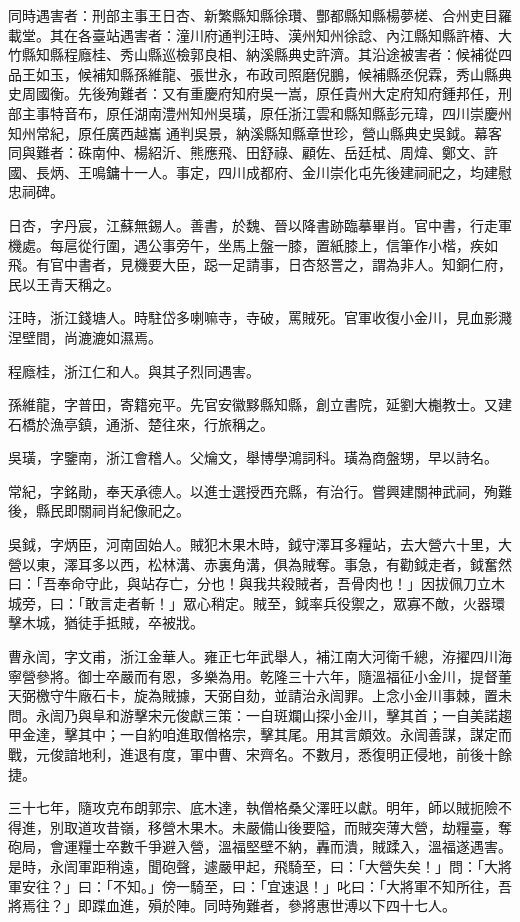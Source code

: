 \begin{pinyinscope}
同時遇害者：刑部主事王日杏、新繁縣知縣徐瓚、酆都縣知縣楊夢槎、合州吏目羅載堂。其在各臺站遇害者：潼川府通判汪時、漢州知州徐諗、內江縣知縣許椿、大竹縣知縣程廕桂、秀山縣巡檢郭良相、納溪縣典史許濟。其沿途被害者：候補從四品王如玉，候補知縣孫維龍、張世永，布政司照磨倪鵬，候補縣丞倪霖，秀山縣典史周國衡。先後殉難者：又有重慶府知府吳一嵩，原任貴州大定府知府鍾邦任，刑部主事特音布，原任湖南澧州知州吳璜，原任浙江雲和縣知縣彭元瑋，四川崇慶州知州常紀，原任廣西越巂通判吳景，納溪縣知縣章世珍，營山縣典史吳鉞。幕客同與難者：硃南仲、楊紹沂、熊應飛、田舒祿、顧佐、岳廷栻、周煒、鄭文、許國、長炳、王鳴鏞十一人。事定，四川成都府、金川崇化屯先後建祠祀之，均建慰忠祠碑。

日杏，字丹宸，江蘇無錫人。善書，於魏、晉以降書跡臨摹畢肖。官中書，行走軍機處。每扈從行圍，遇公事旁午，坐馬上盤一膝，置紙膝上，信筆作小楷，疾如飛。有官中書者，見機要大臣，跽一足請事，日杏怒詈之，謂為非人。知銅仁府，民以王青天稱之。

汪時，浙江錢塘人。時駐岱多喇嘛寺，寺破，罵賊死。官軍收復小金川，見血影濺涅壁間，尚漉漉如濕焉。

程廕桂，浙江仁和人。與其子烈同遇害。

孫維龍，字普田，寄籍宛平。先官安徽黟縣知縣，創立書院，延劉大櫆教士。又建石橋於漁亭鎮，通浙、楚往來，行旅稱之。

吳璜，字鑒南，浙江會稽人。父爚文，舉博學鴻詞科。璜為商盤甥，早以詩名。

常紀，字銘勛，奉天承德人。以進士選授西充縣，有治行。嘗興建關神武祠，殉難後，縣民即關祠肖紀像祀之。

吳鉞，字炳臣，河南固始人。賊犯木果木時，鉞守澤耳多糧站，去大營六十里，大營以東，澤耳多以西，松林溝、赤裏角溝，俱為賊奪。事急，有勸鉞走者，鉞奮然曰：「吾奉命守此，與站存亡，分也！與我共殺賊者，吾骨肉也！」因拔佩刀立木城旁，曰：「敢言走者斬！」眾心稍定。賊至，鉞率兵役禦之，眾寡不敵，火器環擊木城，猶徒手抵賊，卒被戕。

曹永訚，字文甫，浙江金華人。雍正七年武舉人，補江南大河衛千總，洊擢四川海寧營參將。御士卒嚴而有恩，多樂為用。乾隆三十六年，隨溫福征小金川，提督董天弼檄守牛廠石卡，旋為賊據，天弼自劾，並請治永訚罪。上念小金川事棘，置未問。永訚乃與阜和游擊宋元俊獻三策：一自斑斕山探小金川，擊其首；一自美諾趨甲金達，擊其中；一自約咱進取僧格宗，擊其尾。用其言頗效。永訚善謀，謀定而戰，元俊諳地利，進退有度，軍中曹、宋齊名。不數月，悉復明正侵地，前後十餘捷。

三十七年，隨攻克布朗郭宗、底木達，執僧格桑父澤旺以獻。明年，師以賊扼險不得進，別取道攻昔嶺，移營木果木。未嚴備山後要隘，而賊突薄大營，劫糧臺，奪砲局，會運糧士卒數千爭避入營，溫福堅壁不納，轟而潰，賊蹂入，溫福遂遇害。是時，永訚軍距稍遠，聞砲聲，遽嚴甲起，飛騎至，曰：「大營失矣！」問：「大將軍安往？」曰：「不知。」傍一騎至，曰：「宜速退！」叱曰：「大將軍不知所往，吾將焉往？」即蹀血進，殞於陣。同時殉難者，參將惠世溥以下四十七人。


\end{pinyinscope}
